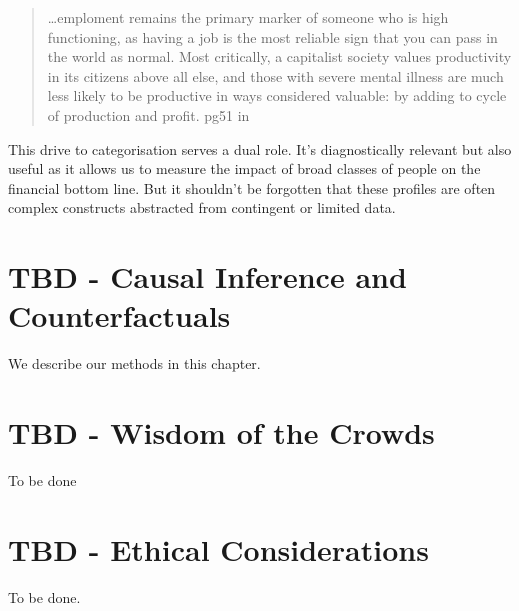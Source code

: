 \documentclass[]{tufte-book}
\theoremstyle{definition}
\theoremstyle{definition}
\theoremstyle{definition}
\theoremstyle{remark}
\begin{document}
\begin{quote}
\ldots emploment remains the primary marker of someone who is high functioning, as having a job is the most reliable sign that you can pass in the world as normal. Most critically, a capitalist society values productivity in its citizens above all else, and those with severe mental illness are much less likely to be productive in ways considered valuable: by adding to cycle of production and profit. pg51 in \citep{WangSchizophrenia}
\end{quote}

This drive to categorisation serves a dual role. It's diagnostically relevant but also useful as it allows us to measure the impact of broad classes of people on the financial bottom line. But it shouldn't be forgotten that these profiles are often complex constructs abstracted from contingent or limited data.

\hypertarget{tbd---causal-inference-and-counterfactuals}{%
\chapter{TBD - Causal Inference and Counterfactuals}\label{tbd---causal-inference-and-counterfactuals}}

We describe our methods in this chapter.

\hypertarget{tbd---wisdom-of-the-crowds}{%
\chapter{TBD - Wisdom of the Crowds}\label{tbd---wisdom-of-the-crowds}}

To be done

\hypertarget{tbd---ethical-considerations}{%
\chapter{TBD - Ethical Considerations}\label{tbd---ethical-considerations}}

To be done.


\end{document}
